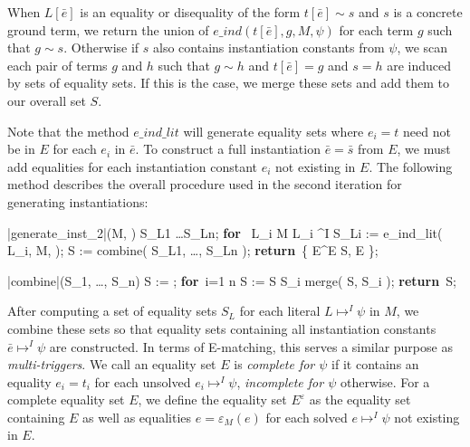 \documentclass{llncs}
\def\RETURN{\keyword{return}\ }
\def\ENDPROC{\untab}
\def\DOFOR{\qtab\keyword{for}\ }
\def\ENDFOR{\untab}
\def\keyword#1{\mbox{\normalshape\bf #1}}
\begin{document}
When $L[\bar{e}]$ is an equality or disequality of the form $t[\bar{e}] \sim s$ and $s$ is a concrete ground term, we return the union of $e\_ind( t[\bar{e}], g, M, \psi )$ for each term $g$ such that $g \sim s$.
Otherwise if $s$ also contains instantiation constants from $\psi$, we scan each pair of terms $g$ and $h$ such that $g \sim h$ and $t[\bar{e}] = g$ and $s = h$ are induced by sets of equality sets.
If this is the case, we merge these sets and add them to our overall set $S$.

Note that the method $e\_ind\_lit$ will generate equality sets where $e_i = t$ need not be in $E$ for each $e_i$ in $\bar{e}$.
To construct a full instantiation $\bar{e} = \bar{s}$ from $E$, we must add equalities for each instantiation constant $e_i$ not existing in $E$.
The following method describes the overall procedure used in the second iteration for generating instantiations:

\begin{minipage}[t]{.4\linewidth}
\begin{program}
\PROC |generate\_inst_2|(M, \psi) \BODY
S_{L1} \ldots S_{Ln};
\DOFOR {} L_i \in M  L_i \mapsto^I \psi
  S_{Li} := e\_ind\_lit( L_i, M, \psi );
\ENDFOR
S := combine( S_{L1}, \ldots, S_{Ln} );
\RETURN \{ E^\varepsilon \mid E \in S, E  \};
\ENDPROC
\end{program}
\end{minipage}
\begin{minipage}[t]{.4\linewidth}
\begin{program}
\PROC |combine|(S_1, \ldots, S_n) \BODY
S := \emptyset;
\DOFOR i=1 \TO n
  S := S \cup S_i \cup merge( S, S_i );
\ENDFOR
\RETURN S;
\ENDPROC
\end{program}
\end{minipage}

After computing a set of equality sets $S_L$ for each literal $L \mapsto^I \psi$ in $M$, we combine these sets so that equality sets containing all instantiation constants $\bar{e} \mapsto^I \psi$ are constructed.
In terms of E-matching, this serves a similar purpose as \emph{multi-triggers}.
We call an equality set $E$ is \emph{complete for $\psi$} if it contains an equality $e_i = t_i$ for each unsolved $e_i \mapsto^I \psi$, \emph{incomplete for $\psi$} otherwise.
For a complete equality set $E$, we define the equality set $E^\varepsilon$ as the equality set containing $E$ as well as equalities $ e = \varepsilon_M( e )$ for each solved $e \mapsto^I \psi$ not existing in $E$.
\end{document}
